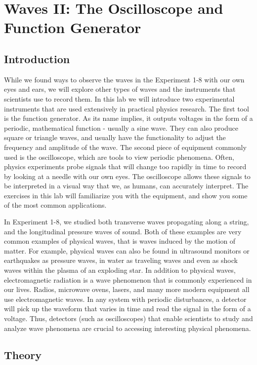 \chapter{Waves II: The Oscilloscope and Function Generator}
\label{chap:waves}
\section{Introduction}
While we found ways to observe the waves in the Experiment 1-8 with our own eyes and ears, we will explore other types of waves and the instruments that scientists use to record them. In this lab we will introduce two experimental instruments that are used extensively in practical physics research. The first tool is the function generator. As its name implies, it outputs voltages in the form of a periodic, mathematical function - usually a sine wave. They can also produce square or triangle waves, and usually have the functionality to adjust the frequency and amplitude of the wave. The second piece of equipment commonly used is the oscilloscope, which are tools to view periodic phenomena. Often, physics experiments probe signals that will change too rapidly in time to record by looking at a needle with our own eyes. The oscilloscope allows these signals to be interpreted in a visual way that we, as humans, can accurately interpret. The exercises in this lab will familiarize you with the equipment, and show you some of the most common applications.\myskip

In Experiment 1-8, we studied both transverse waves propagating along a string, and the longitudinal pressure waves of sound. Both of these examples are very common examples of physical waves, that is waves induced by the motion of matter. For example, physical waves can also be found in ultrasound monitors or earthquakes as pressure waves, in water as traveling waves and even as shock waves within the plasma of an exploding star. In addition to physical waves, electromagnetic radiation is a wave phenomenon that is commonly experienced in our lives. Radios, microwave ovens, lasers, and many more modern equipment all use electromagnetic waves. In any system with periodic disturbances, a detector will pick up the waveform that varies in time and read the signal in the form of a voltage. Thus, detectors (such as oscilloscopes) that enable scientists to study and analyze wave phenomena are crucial to accessing interesting physical phenomena.

\section{Theory}
